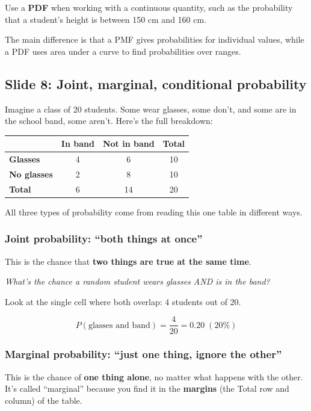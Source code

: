 Use a \textbf{PDF} when working with a continuous quantity, such as the probability that a student's height is between 150 cm and 160 cm.

The main difference is that a PMF gives probabilities for individual values, while a PDF uses area under a curve to find probabilities over ranges.
\subsection*{Slide 8: Joint, marginal, conditional probability}
Imagine a class of 20 students. Some wear glasses, some don't, and some are in the school band, some aren't. Here's the full breakdown:

\begin{center}
\begin{tabular}{lccc}
\toprule
 & In band & Not in band & Total \\
\midrule
\textbf{Glasses} & 4 & 6 & 10 \\
\textbf{No glasses} & 2 & 8 & 10 \\
\midrule
\textbf{Total} & 6 & 14 & 20 \\
\bottomrule
\end{tabular}
\end{center}

All three types of probability come from reading this one table in different ways.

\subsubsection*{Joint probability: ``both things at once''}

This is the chance that \textbf{two things are true at the same time}.

\emph{What's the chance a random student wears glasses AND is in the band?}

Look at the single cell where both overlap: 4 students out of 20.

\[
P(\text{glasses and band}) = \frac{4}{20} = 0.20 \; (20\%)
\]

\subsubsection*{Marginal probability: ``just one thing, ignore the other''}

This is the chance of \textbf{one thing alone}, no matter what happens with the other. It's called ``marginal'' because you find it in the \textbf{margins} (the Total row and column) of the table.

